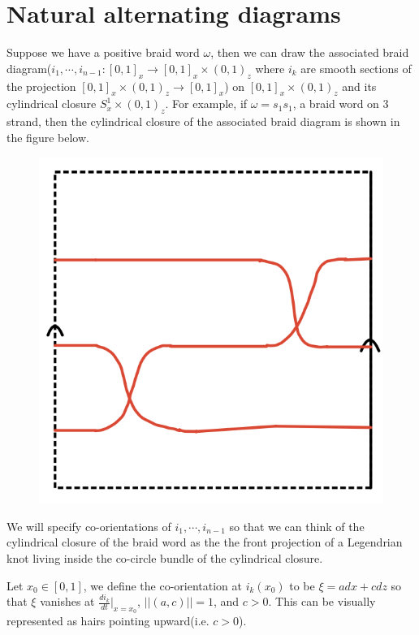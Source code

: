 \section{Natural alternating diagrams}

Suppose we have a positive braid word $\omega$, then we can draw the associated braid diagram($i_1,\cdots,i_{n-1}: [0,1]_{x}\rightarrow [0,1]_{x} \times (0,1)_{z}$ where $i_{k}$ are smooth sections of the projection $[0,1]_{x} \times (0,1)_{z} \rightarrow [0,1]_{x}$) on $[0,1]_{x} \times (0,1)_{z}$ and its cylindrical closure $S^{1}_{x} \times (0,1)_{z}$. For example, if $\omega = s_{1}s_{1}$, a braid word on $3$ strand, then the cylindrical closure of the associated braid diagram is shown in the figure below.

\begin{figure}[H] 
    \centering
    \includegraphics[scale = 0.55]{diagrams/natural_alternating_diagrams/1.png}
    \caption{}
    \label{fig:your-label}
\end{figure}


We will specify co-orientations of $i_1, \cdots, i_{n-1}$ so that we can think of the cylindrical closure of the braid word as the the front projection of a Legendrian knot living inside the co-circle bundle of the cylindrical closure.

Let $x_0 \in [0,1]$, we define the co-orientation at $i_k(x_0)$ to be $\xi = adx + cdz$ so that $\xi$ vanishes at $\frac{di_k}{dt}|_{x=x_0}$, $||(a,c)||= 1$, and $c>0$. This can be visually represented as hairs pointing upward(i.e. $c>0$).

